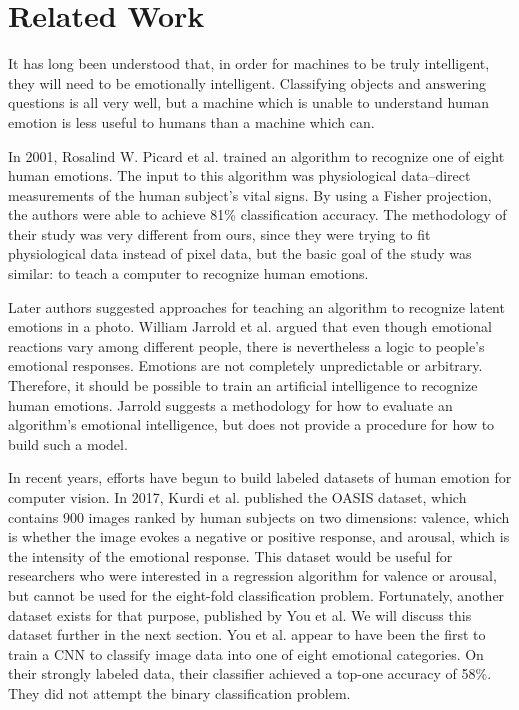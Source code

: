 \documentclass[10pt,twocolumn,letterpaper]{article}
\begin{document}
\section{Related Work}
It has long been understood that, in order for machines to be truly intelligent, they will need to be emotionally intelligent. Classifying objects and answering questions is all very well, but a machine which is unable to understand human emotion is less useful to humans than a machine which can.

In 2001, Rosalind W. Picard et al. trained an algorithm to recognize one of eight human emotions\cite{earlyeq}.  The input to this algorithm was physiological data--direct measurements of the human subject's vital signs. By using a Fisher projection, the authors were able to achieve 81\% classification accuracy. The methodology of their study was very different from ours, since they were trying to fit physiological data instead of pixel data, but the basic goal of the study was similar: to teach a computer to recognize human emotions.

Later authors suggested approaches for teaching an algorithm to recognize latent emotions in a photo. William Jarrold et al.\cite{methodologyproposed} argued that even though emotional reactions vary among different people, there is nevertheless a logic to people's emotional responses. Emotions are not completely unpredictable or arbitrary. Therefore, it should be possible to train an artificial intelligence to recognize human emotions. Jarrold suggests a methodology for how to evaluate an algorithm's emotional intelligence, but does not provide a procedure for how to build such a model.

In recent years, efforts have begun to build labeled datasets of human emotion for computer vision. In 2017, Kurdi et al. published the OASIS dataset\cite{oasis}, which contains 900 images ranked by human subjects on two dimensions: valence, which is whether the image evokes a negative or positive response, and arousal, which is the intensity of the emotional response. This dataset would be useful for researchers who were interested in a regression algorithm for valence or arousal, but cannot be used for the eight-fold classification problem. Fortunately, another dataset exists for that purpose, published by You et al\cite{ourdata}. We will discuss this dataset further in the next section. You et al. appear to have been the first to train a CNN to classify image data into one of eight emotional categories. On their strongly labeled data, their classifier achieved a top-one accuracy of 58\%. They did not attempt the binary classification problem.
\end{document}
